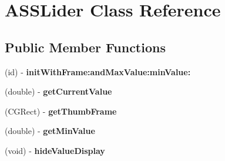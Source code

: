 \hypertarget{interface_a_s_s_lider}{
\section{\-A\-S\-S\-Lider \-Class \-Reference}
\label{interface_a_s_s_lider}
}
\subsection*{\-Public \-Member \-Functions}
\begin{DoxyCompactItemize}
\item 
\hypertarget{interface_a_s_s_lider_ae9fab65f88a0ff1fc5a4b46955e8b86a}{
(id) -\/ {\bfseries init\-With\-Frame\-:and\-Max\-Value\-:min\-Value\-:}}
\label{interface_a_s_s_lider_ae9fab65f88a0ff1fc5a4b46955e8b86a}

\item 
\hypertarget{interface_a_s_s_lider_a384367cc7bbc8d2ac0e8a84e5710ce07}{
(double) -\/ {\bfseries get\-Current\-Value}}
\label{interface_a_s_s_lider_a384367cc7bbc8d2ac0e8a84e5710ce07}

\item 
\hypertarget{interface_a_s_s_lider_abe02ff796971e0c93dabc52182d5d1ba}{
(\-C\-G\-Rect) -\/ {\bfseries get\-Thumb\-Frame}}
\label{interface_a_s_s_lider_abe02ff796971e0c93dabc52182d5d1ba}

\item 
\hypertarget{interface_a_s_s_lider_ac740ab8f55eac0f728121d1c79bbb4c5}{
(double) -\/ {\bfseries get\-Min\-Value}}
\label{interface_a_s_s_lider_ac740ab8f55eac0f728121d1c79bbb4c5}

\item 
\hypertarget{interface_a_s_s_lider_aab8b3c0cef12c6ef8c9ada786c518e6e}{
(void) -\/ {\bfseries hide\-Value\-Display}}
\label{interface_a_s_s_lider_aab8b3c0cef12c6ef8c9ada786c518e6e}

\end{DoxyCompactItemize}
